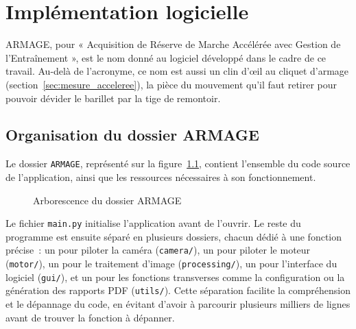 \chapter{Implémentation logicielle}

ARMAGE, pour « Acquisition de Réserve de Marche Accélérée avec Gestion de
l'Entraînement », est le nom donné au logiciel développé dans le cadre de ce
travail. Au-delà de l'acronyme, ce nom est aussi un clin d'œil au cliquet
d'armage (section~\ref{sec:mesure_acceleree}), la pièce du mouvement qu'il
faut retirer pour pouvoir dévider le barillet par la tige de remontoir.

\section{Organisation du dossier ARMAGE}

Le dossier \texttt{ARMAGE}, représenté sur la figure~\ref{fig:armage-arborescence},
contient l'ensemble du code source de l'application, ainsi que les
ressources nécessaires à son fonctionnement.

\begin{figure}[H]
    \DTsetlength{0.2em}{1em}{0.2em}{0.4pt}{1.6pt}
    \caption{Arborescence du dossier ARMAGE}
    \label{fig:armage-arborescence}
\end{figure}

Le fichier \texttt{main.py} initialise l'application avant de l'ouvrir. Le
reste du programme est ensuite séparé en plusieurs dossiers, chacun dédié à
une fonction précise~: un pour piloter la caméra (\texttt{camera/}), un
pour piloter le moteur (\texttt{motor/}), un pour le traitement d'image
(\texttt{processing/}), un pour l'interface du logiciel (\texttt{gui/}), et
un pour les fonctions transverses comme la configuration ou la génération
des rapports PDF (\texttt{utils/}). Cette séparation facilite la
compréhension et le dépannage du code, en évitant d'avoir à parcourir
plusieurs milliers de lignes avant de trouver la fonction à dépanner.

